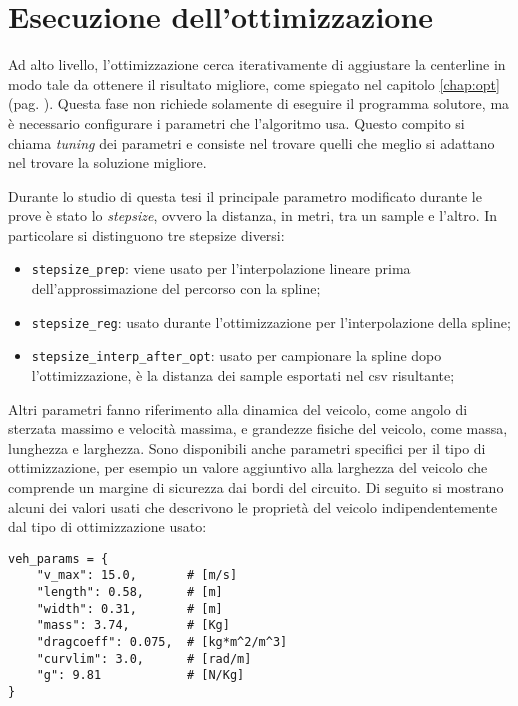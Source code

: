 \newpage


\section{Esecuzione dell'ottimizzazione}
Ad alto livello, l'ottimizzazione cerca iterativamente di aggiustare la centerline in modo tale da
ottenere il risultato migliore, come spiegato nel capitolo \ref{chap:opt} (pag. \pageref{chap:opt}).
Questa fase non richiede solamente di eseguire il programma solutore, ma è necessario
configurare i parametri che l'algoritmo usa. Questo compito si chiama \textit{tuning} dei parametri
e consiste nel trovare quelli che meglio si adattano nel trovare la soluzione migliore.

Durante lo studio di questa tesi il principale parametro modificato durante le prove è stato lo
\textit{stepsize}, ovvero la distanza, in metri, tra un sample e l'altro. In particolare si distinguono
tre stepsize diversi:
\begin{itemize}
	\item \verb|stepsize_prep|: viene usato per l'interpolazione lineare prima dell'approssimazione del
		percorso con la spline;
	\item \verb|stepsize_reg|: usato durante l'ottimizzazione per l'interpolazione della spline;
	\item \verb|stepsize_interp_after_opt|: usato per campionare la spline dopo l'ottimizzazione, è la
		distanza dei sample esportati nel csv risultante;
\end{itemize}
Altri parametri fanno riferimento alla dinamica del veicolo, come angolo di sterzata massimo e velocità
massima, e grandezze fisiche del veicolo, come massa, lunghezza e larghezza. Sono disponibili anche
parametri specifici per il tipo di ottimizzazione, per esempio un valore aggiuntivo alla larghezza del
veicolo che comprende un margine di sicurezza dai bordi del circuito. Di seguito si mostrano alcuni dei
valori usati che descrivono le proprietà del veicolo indipendentemente dal tipo di ottimizzazione usato:

\begin{lstlisting}
veh_params = {
	"v_max": 15.0,       # [m/s]
	"length": 0.58,      # [m]
	"width": 0.31,       # [m]
	"mass": 3.74,        # [Kg]
	"dragcoeff": 0.075,  # [kg*m^2/m^3]
	"curvlim": 3.0,      # [rad/m]
	"g": 9.81            # [N/Kg]
}
\end{lstlisting}

